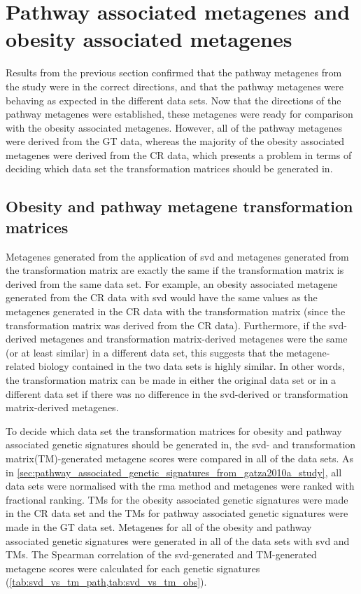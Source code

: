 \section{Pathway associated metagenes and obesity associated metagenes}
\label{sec:pathway_associated_metagenes_and_obesity_associated_metagenes}

Results from the previous section confirmed that the pathway metagenes from the \citet{Gatza2010a} study were in the correct directions, and that the pathway metagenes were behaving as expected in the different data sets.
Now that the directions of the pathway metagenes were established, these metagenes were ready for comparison with the obesity associated metagenes.
However, all of the pathway metagenes were derived from the GT data, whereas the majority of the obesity associated metagenes were derived from the CR data, which presents a problem in terms of deciding which data set the transformation matrices should be generated in.

\subsection{Obesity and pathway metagene transformation matrices}
\label{sub:obesity_and_pathway_metagene_transformation_matrices}

Metagenes generated from the application of \gls{svd} and metagenes generated from the transformation matrix are exactly the same if the transformation matrix is derived from the same data set.
For example, an obesity associated metagene generated from the CR data with \gls{svd} would have the same values as the metagenes generated in the CR data with the transformation matrix (since the transformation matrix was derived from the CR data).
Furthermore, if the \gls{svd}-derived metagenes and transformation matrix-derived metagenes were the same (or at least similar) in a different data set, this suggests that the metagene-related biology contained in the two data sets is highly similar.
In other words, the transformation matrix can be made in either the original data set or in a different data set if there was no difference in the \gls{svd}-derived or transformation matrix-derived metagenes.

To decide which data set the transformation matrices for obesity and pathway associated genetic signatures should be generated in, the \gls{svd}- and transformation matrix(TM)-generated metagene scores were compared in all of the data sets.
As in \cref{sec:pathway_associated_genetic_signatures_from_gatza2010a_study}, all data sets were normalised with the \gls{rma} method and metagenes were ranked with fractional ranking.
TMs for the obesity associated genetic signatures were made in the CR data set and the TMs for pathway associated genetic signatures were made in the GT data set.
Metagenes for all of the obesity and pathway associated genetic signatures were generated in all of the data sets with \gls{svd} and TMs.
The Spearman correlation of the \gls{svd}-generated and TM-generated metagene scores were calculated for each genetic signatures (\cref{tab:svd_vs_tm_path,tab:svd_vs_tm_obs}).

